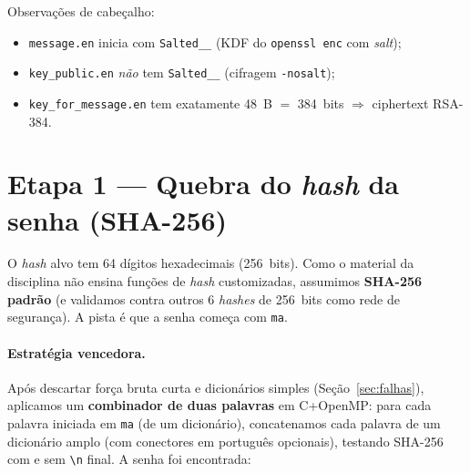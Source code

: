 \documentclass[11pt,a4paper]{article}
\begin{document}
\begin{center}
\end{center}

\noindent Observações de cabeçalho:
\begin{itemize}[nosep]
  \item \texttt{message.en} inicia com \texttt{Salted\_\_} (KDF do \texttt{openssl enc} com \emph{salt});
  \item \texttt{key\_public.en} \emph{não} tem \texttt{Salted\_\_} (cifragem \texttt{-nosalt});
  \item \texttt{key\_for\_message.en} tem exatamente 48~B $=$ 384~bits $\Rightarrow$ ciphertext RSA-384.
\end{itemize}

\section{Etapa 1 --- Quebra do \emph{hash} da senha (SHA-256)}
\label{sec:hash}
O \emph{hash} alvo tem 64 dígitos hexadecimais (256~bits). Como o material da disciplina não ensina
funções de \emph{hash} customizadas, assumimos \textbf{SHA-256 padrão} (e validamos contra outros 6
\emph{hashes} de 256~bits como rede de segurança). A pista é que a senha começa com \texttt{ma}.

\paragraph{Estratégia vencedora.} Após descartar força bruta curta e dicionários simples
(Seção~\ref{sec:falhas}), aplicamos um \textbf{combinador de duas palavras} em C+OpenMP: para cada
palavra iniciada em \texttt{ma} (de um dicionário), concatenamos cada palavra de um dicionário amplo
(com conectores em português opcionais), testando SHA-256 com e sem \texttt{\textbackslash n} final.
A senha foi encontrada:
\end{document}
